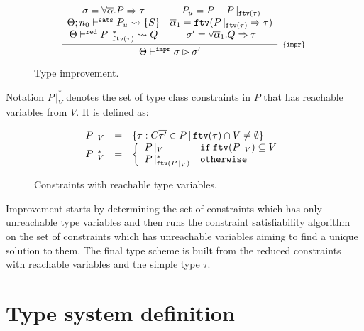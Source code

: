 \documentclass[a4paper, 11pt]{article}
\begin{document}
\begin{figure}[H]
  \[
    \infer[_{\{\mathtt{impr}\}}]
          {\Theta \impr \sigma \rhd \sigma'}
          {\begin{array}{cc}
            \sigma = \forall\overline{\alpha} . P \Rightarrow \tau & P_u = P - P\,|_{\ftv(\tau)} \\ 
            \Theta ; n_0 \vdash^{\mathtt{sats}} P_u \leadsto \{S\} & \overline{\alpha}_1 = \ftv(P\,|_{\ftv(\tau)} \Rightarrow \tau)\\
            \Theta \reduce P\,|^*_{\ftv(\tau)} \leadsto Q & \sigma' = \forall \overline{\alpha}_1 . Q\Rightarrow\tau\\ 
           \end{array}}
  \]
  \centering 
  \caption{Type improvement.}
  \label{fig:impr}
\end{figure}
 Notation $P\,|^*_{V}$ denotes the 
set of type class constraints in $P$ that has reachable variables 
from $V$. It is defined as: 
\begin{figure}[H]
  \[
    \begin{array}{lcl} 
      P\,|_{V} & = & \{\tau : C\overline{\tau'} \in P\,|\,\mathtt{ftv}(\tau) \cap V \neq \emptyset\}\\
      P\,|^{*}_{V} & = & \left\{
                  \begin{array}{ll}
                    P\,|_{V} & \mathtt{if}\:\mathtt{ftv}(P\,|_{V}) \subseteq V \\ 
                    P\,|^{*}_{\mathtt{ftv}(P\,|_{V})} & \mathtt{otherwise}\\
                  \end{array}
                   \right.
    \end{array} 
  \]
  \caption{Constraints with reachable type variables.}
  \label{fig:constrreach}
\end{figure}
Improvement starts by determining the set of constraints which 
has only unreachable type variables and then runs the constraint 
satisfiability algorithm on the set of constraints which has 
unreachable variables aiming to find a unique solution to them. 
The final type scheme is built from the reduced constraints with 
reachable variables and the simple type $\tau$.



\section{Type system definition}
\end{document}
